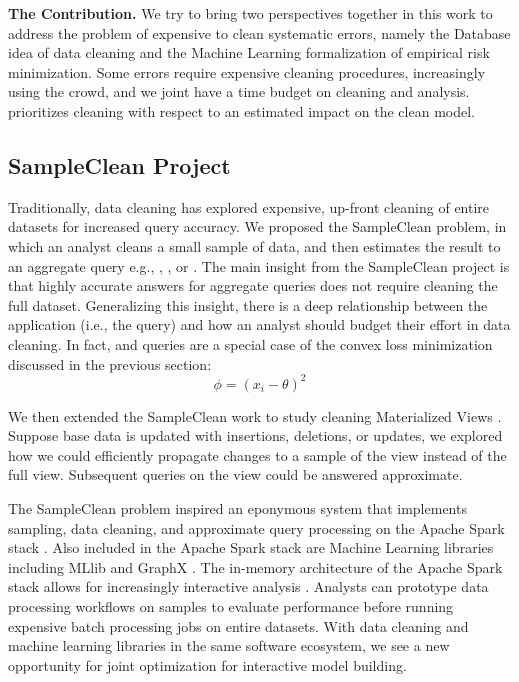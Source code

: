 \vspace{0.5em}

\noindent\textbf{The \sys Contribution. } We try to bring two perspectives together in this work to address the problem of expensive to clean systematic errors, namely the Database idea of data cleaning and the Machine Learning formalization of empirical risk minimization.
Some errors require expensive cleaning procedures, increasingly using the crowd, and we joint have a time budget on cleaning and analysis.
\sys prioritizes cleaning with respect to an estimated impact on the clean model.

\subsection{SampleClean Project}

Traditionally, data cleaning has explored expensive, up-front cleaning of entire datasets for increased query accuracy.
We proposed the SampleClean problem, in which an analyst cleans a small sample of data, and then estimates the result to an aggregate query e.g., \sumfunc, \countfunc, or \avgfunc.
The main insight from the SampleClean project is that highly accurate answers for aggregate queries does not require cleaning the full dataset.
Generalizing this insight, there is a deep relationship between the application (i.e., the query) and how an analyst should budget their effort in data cleaning.
In fact, \avgfunc and \sumfunc queries are a special case of the convex loss minimization discussed in the previous section:
\[
\phi = (x_{i} - \theta)^2
\]

We then extended the SampleClean work to study cleaning Materialized Views \cite{technicalReport}.
Suppose base data is updated with insertions, deletions, or updates, we explored how we could efficiently propagate
changes to a sample of the view instead of the full view.
Subsequent queries on the view could be answered approximate.

The SampleClean problem inspired an eponymous system that implements sampling, data cleaning, and approximate query processing on the Apache Spark stack \cite{sampleclean}.
Also included in the Apache Spark stack are Machine Learning libraries including MLlib \cite{mllib} and GraphX \cite{graphx}.
The in-memory architecture of the Apache Spark stack allows for increasingly interactive analysis \cite{AgarwalMPMMS13, armbrust2015spark}.
Analysts can prototype data processing workflows on samples to evaluate performance before running expensive batch processing jobs on entire datasets.
With data cleaning and machine learning libraries in the same software ecosystem, we see a new opportunity for joint optimization for interactive model building.



